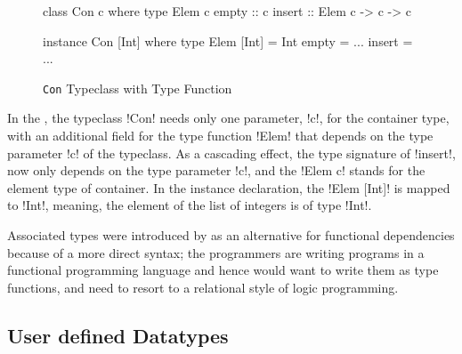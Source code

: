 \documentclass[screen,nonacm]{acmart}
\begin{document}
\begin{figure}[ht]
\begin{center}
\begin{minipage}[ht]{0.4\linewidth}
\begin{CenteredBox}
\begin{code}
class Con c where
  type Elem c
  empty :: c
  insert :: Elem c -> c -> c
\end{code}
\end{CenteredBox}
\end{minipage}%
\begin{minipage}[ht]{0.4\linewidth}
\begin{CenteredBox}
\begin{code}
instance Con [Int] where
  type Elem [Int] = Int
  empty = ...
  insert = ...
\end{code}
\end{CenteredBox}
\end{minipage}
\end{center}
\caption[Con typeclass]{\lstinline{Con} Typeclass with Type Function}
\label{fig:assoc-types}
\end{figure}

In the , the typeclass !Con! needs only one
parameter, !c!, for the container type, with an additional field for
the type function !Elem! that depends on the type parameter !c! of the
typeclass. As a cascading effect, the type signature of !insert!, now only depends on
the type parameter !c!, and the !Elem c! stands for the element
type of container. In the instance declaration, the !Elem [Int]! is mapped to
!Int!, meaning, the element of the list of integers is of type !Int!.

Associated types were introduced by
\citet{chakravarty_associated_2005}
as an alternative for functional dependencies because of a more
direct syntax; the programmers are writing programs in a functional
programming language and hence would want to write them as type
functions, and need to resort to a relational style of logic programming.



\subsection{User defined Datatypes}
\end{document}
